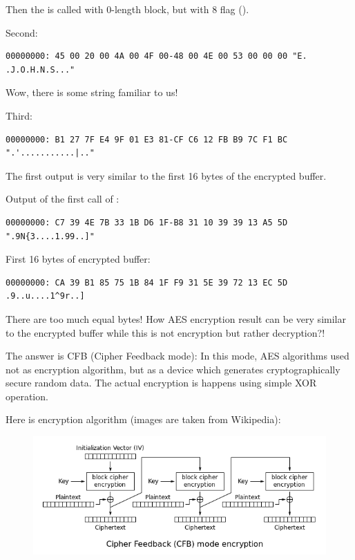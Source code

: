 Then the  is called with 0-length block, but with 8 flag ().

Second:

\begin{lstlisting}
00000000: 45 00 20 00 4A 00 4F 00-48 00 4E 00 53 00 00 00 "E. .J.O.H.N.S..."
\end{lstlisting}

Wow, there is some string familiar to us!

Third:

\begin{lstlisting}
00000000: B1 27 7F E4 9F 01 E3 81-CF C6 12 FB B9 7C F1 BC ".'...........|.."
\end{lstlisting}

The first output is very similar to the first 16 bytes of the encrypted buffer.

Output of the first call of :

\begin{lstlisting}
00000000: C7 39 4E 7B 33 1B D6 1F-B8 31 10 39 39 13 A5 5D ".9N{3....1.99..]"
\end{lstlisting}

First 16 bytes of encrypted buffer:

\begin{lstlisting}
00000000: CA 39 B1 85 75 1B 84 1F F9 31 5E 39 72 13 EC 5D  .9..u....1^9r..]
\end{lstlisting}

There are too much equal bytes!
How AES encryption result can be very similar to the encrypted buffer while this is not
encryption but rather decryption?!


The answer is CFB (Cipher Feedback mode):
In this mode, AES algorithms used not as encryption algorithm, but as a device which generates cryptographically secure random data.
The actual encryption is happens using simple XOR operation.

Here is encryption algorithm (images are taken from Wikipedia):

\begin{figure}[H]
\centering
\includegraphics[scale=\FigScale]{examples/encrypted_DB1/601px-CFB_encryption.svg.png}
\end{figure}

